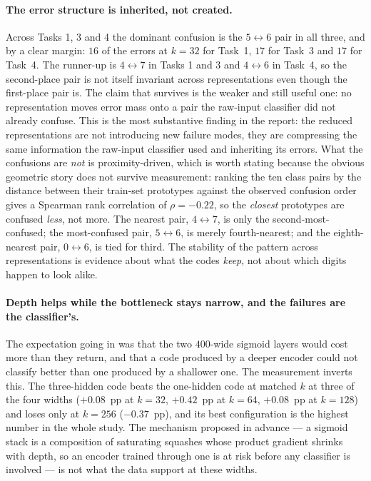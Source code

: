 \documentclass[11pt,a4paper]{article}
\begin{document}
\paragraph{The error structure is inherited, not created.}\label{sec:obs:confusion}
Across Tasks 1, 3 and 4 the dominant confusion is the $5\leftrightarrow6$ pair in all three, and by
a clear margin: $16$ of the errors at $k=32$ for Task~1, $17$ for Task~3 and $17$ for Task~4.
The runner-up is $4\leftrightarrow7$ in Tasks 1 and 3 and $4\leftrightarrow6$ in Task~4, so the
second-place pair is not itself invariant across representations even though the first-place pair
is.  The claim that survives is the weaker and still useful one: no representation moves error mass
onto a pair the raw-input classifier did not already confuse.  This
is the most substantive finding in the report: the reduced representations are not introducing new
failure modes, they are compressing the same information the raw-input classifier used and
inheriting its errors.  What the confusions are \emph{not} is proximity-driven, which is
worth stating because the obvious geometric story does not survive measurement: ranking
the ten class pairs by the distance between their train-set prototypes against the
observed confusion order gives a Spearman rank correlation of $\rho=-0.22$, so the
\emph{closest} prototypes are confused \emph{less}, not more.  The nearest pair,
$4\leftrightarrow7$, is only the second-most-confused; the most-confused pair,
$5\leftrightarrow6$, is merely fourth-nearest; and the eighth-nearest pair,
$0\leftrightarrow6$, is tied for third.  The stability of the pattern across
representations is evidence about what the codes \emph{keep}, not about which
digits happen to look alike.

\paragraph{Depth helps while the bottleneck stays narrow, and the failures are the classifier's.}
The expectation going in was that the two $400$-wide sigmoid layers would cost more than they
return, and that a code produced by a deeper encoder could not classify better than one produced by
a shallower one.  The measurement inverts this.  The three-hidden code beats the one-hidden code at
matched $k$ at three of the four widths ($+0.08$~pp at $k=32$, $+0.42$~pp at $k=64$, $+0.08$~pp at
$k=128$) and loses only at $k=256$ ($-0.37$~pp), and its best configuration is the highest number
in the whole study.  The mechanism proposed in advance --- a sigmoid stack is a composition of
saturating squashes whose product gradient shrinks with depth, so an encoder trained through one is
at risk before any classifier is involved --- is not what the data support at these widths.
\end{document}
